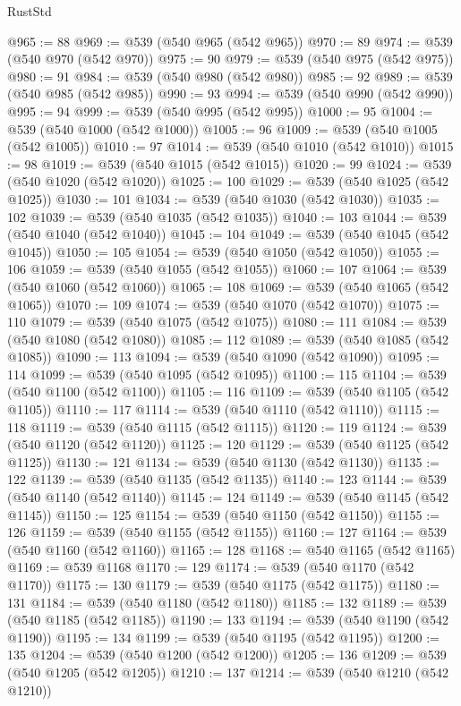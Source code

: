 \begin{lexlean}{RustStd}
\begin{coremodule}
@965 := 88
@969 := @539 (@540 @965 (@542 @965))
@970 := 89
@974 := @539 (@540 @970 (@542 @970))
@975 := 90
@979 := @539 (@540 @975 (@542 @975))
@980 := 91
@984 := @539 (@540 @980 (@542 @980))
@985 := 92
@989 := @539 (@540 @985 (@542 @985))
@990 := 93
@994 := @539 (@540 @990 (@542 @990))
@995 := 94
@999 := @539 (@540 @995 (@542 @995))
@1000 := 95
@1004 := @539 (@540 @1000 (@542 @1000))
@1005 := 96
@1009 := @539 (@540 @1005 (@542 @1005))
@1010 := 97
@1014 := @539 (@540 @1010 (@542 @1010))
@1015 := 98
@1019 := @539 (@540 @1015 (@542 @1015))
@1020 := 99
@1024 := @539 (@540 @1020 (@542 @1020))
@1025 := 100
@1029 := @539 (@540 @1025 (@542 @1025))
@1030 := 101
@1034 := @539 (@540 @1030 (@542 @1030))
@1035 := 102
@1039 := @539 (@540 @1035 (@542 @1035))
@1040 := 103
@1044 := @539 (@540 @1040 (@542 @1040))
@1045 := 104
@1049 := @539 (@540 @1045 (@542 @1045))
@1050 := 105
@1054 := @539 (@540 @1050 (@542 @1050))
@1055 := 106
@1059 := @539 (@540 @1055 (@542 @1055))
@1060 := 107
@1064 := @539 (@540 @1060 (@542 @1060))
@1065 := 108
@1069 := @539 (@540 @1065 (@542 @1065))
@1070 := 109
@1074 := @539 (@540 @1070 (@542 @1070))
@1075 := 110
@1079 := @539 (@540 @1075 (@542 @1075))
@1080 := 111
@1084 := @539 (@540 @1080 (@542 @1080))
@1085 := 112
@1089 := @539 (@540 @1085 (@542 @1085))
@1090 := 113
@1094 := @539 (@540 @1090 (@542 @1090))
@1095 := 114
@1099 := @539 (@540 @1095 (@542 @1095))
@1100 := 115
@1104 := @539 (@540 @1100 (@542 @1100))
@1105 := 116
@1109 := @539 (@540 @1105 (@542 @1105))
@1110 := 117
@1114 := @539 (@540 @1110 (@542 @1110))
@1115 := 118
@1119 := @539 (@540 @1115 (@542 @1115))
@1120 := 119
@1124 := @539 (@540 @1120 (@542 @1120))
@1125 := 120
@1129 := @539 (@540 @1125 (@542 @1125))
@1130 := 121
@1134 := @539 (@540 @1130 (@542 @1130))
@1135 := 122
@1139 := @539 (@540 @1135 (@542 @1135))
@1140 := 123
@1144 := @539 (@540 @1140 (@542 @1140))
@1145 := 124
@1149 := @539 (@540 @1145 (@542 @1145))
@1150 := 125
@1154 := @539 (@540 @1150 (@542 @1150))
@1155 := 126
@1159 := @539 (@540 @1155 (@542 @1155))
@1160 := 127
@1164 := @539 (@540 @1160 (@542 @1160))
@1165 := 128
@1168 := @540 @1165 (@542 @1165)
@1169 := @539 @1168
@1170 := 129
@1174 := @539 (@540 @1170 (@542 @1170))
@1175 := 130
@1179 := @539 (@540 @1175 (@542 @1175))
@1180 := 131
@1184 := @539 (@540 @1180 (@542 @1180))
@1185 := 132
@1189 := @539 (@540 @1185 (@542 @1185))
@1190 := 133
@1194 := @539 (@540 @1190 (@542 @1190))
@1195 := 134
@1199 := @539 (@540 @1195 (@542 @1195))
@1200 := 135
@1204 := @539 (@540 @1200 (@542 @1200))
@1205 := 136
@1209 := @539 (@540 @1205 (@542 @1205))
@1210 := 137
@1214 := @539 (@540 @1210 (@542 @1210))

\end{coremodule}
\end{lexlean}

